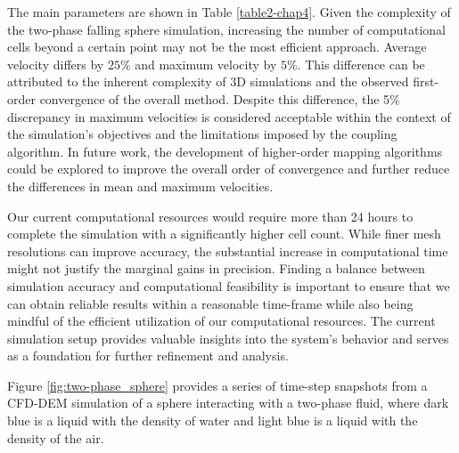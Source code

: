 The main parameters are shown in Table \ref{table2-chap4}. Given the complexity of the two-phase falling sphere simulation, increasing the number of computational cells beyond a certain point may not be the most efficient approach. Average velocity differs by $25$\% and maximum velocity by $5$\%. This difference can be attributed to the inherent complexity of 3D simulations and the observed first-order convergence of the overall method. Despite this difference, the 5\% discrepancy in maximum velocities is considered acceptable within the context of the simulation's objectives and the limitations imposed by the coupling algorithm. In future work, the development of higher-order mapping algorithms could be explored to improve the overall order of convergence and further reduce the differences in mean and maximum velocities. 

Our current computational resources would require more than 24 hours to complete the simulation with a significantly higher cell count. While finer mesh resolutions can improve accuracy, the substantial increase in computational time might not justify the marginal gains in precision. Finding a balance between simulation accuracy and computational feasibility is important to ensure that we can obtain reliable results within a reasonable time-frame while also being mindful of the efficient utilization of our computational resources. The current simulation setup provides valuable insights into the system's behavior and serves as a foundation for further refinement and analysis.

Figure \ref{fig:two-phase_sphere} provides a series of time-step snapshots from a CFD-DEM simulation of a sphere interacting with a two-phase fluid, where dark blue is a liquid with the density of water and light blue is a liquid with the density of the air.

